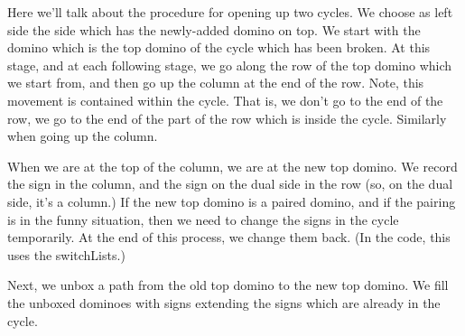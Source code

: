 \documentclass[12pt]{article}
\numberwithin{equation}{section}
\begin{document}
  Here we'll talk about the procedure for opening up two cycles.
  We choose as left side the side which has the newly-added domino on top.
  We start with the domino which is the top domino of the cycle which has been broken.
  At this stage, and at each following stage, we go along the row of the top domino which we start from, and then go up the column at the end of the row.
  Note, this movement is contained within the cycle.
  That is, we don't go to the end of the row, we go to the end of the part of the row which is inside the cycle.
  Similarly when going up the column.

  When we are at the top of the column, we are at the new top domino.
  We record the sign in the column, and the sign on the dual side in the row (so, on the dual side, it's a column.)
  If the new top domino is a paired domino, and if the pairing is in the funny situation, then we need to change the signs in the cycle temporarily.
  At the end of this process, we change them back.
  (In the code, this uses the switchLists.)

  Next, we unbox a path from the old top domino to the new top domino.
  We fill the unboxed dominoes with signs extending the signs which are already in the cycle.
\end{document}
